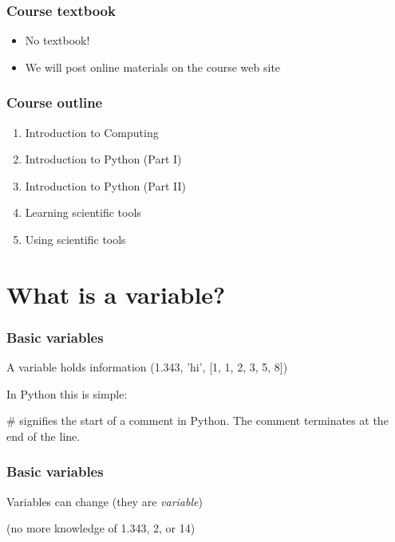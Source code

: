 \documentclass{beamer}
\begin{document}
\begin{frame}
\frametitle{Course textbook}

\begin{itemize}
\setlength{\itemsep}{0.2in}
\item{No textbook!}
\item{We will post online materials on the course web site}
\end{itemize}

\end{frame}



\begin{frame}
\frametitle{Course outline}

\begin{enumerate}
\setlength{\itemsep}{0.2in}

\item{Introduction to Computing}
\item{Introduction to Python (Part I)}
\item{Introduction to Python (Part II)}
\item{Learning scientific tools}
\item{Using scientific tools}

\end{enumerate}

\end{frame}



\section{What is a variable?}
\begin{frame}
\frametitle{Basic variables}

A variable holds information (1.343, 'hi', [1, 1, 2, 3, 5, 8])

\vspace{0.2in}

In Python this is simple:


\textcolor{comment-color}{\#} signifies the start of a comment in Python.  The comment terminates at the end of the line.

\end{frame}


\begin{frame}
\frametitle{Basic variables}

Variables can change (they are \emph{variable})



(no more knowledge of 1.343, 2, or 14)

\end{frame}
\end{document}
